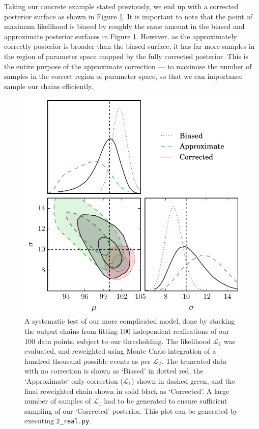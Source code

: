 \documentclass[a4paper,fleqn,usenatbib]{mnras}
\begin{document}
Taking our concrete example stated previously, we end up with a corrected posterior surface as shown in Figure \ref{fig:real}. It is important to note that the point of maximum likelihood is biased by roughly the same amount in the biased and approximate posterior surfaces in Figure \ref{fig:real}. However, as the approximately correctly posterior is broader than the biased surface, it has far more samples in the region of parameter space mapped by the fully corrected posterior. This is the entire purpose of the approximate correction --- to maximise the number of samples in the correct region of parameter space, so that we can importance sample our chains efficiently.
\begin{figure}
	\begin{center}
		\includegraphics[width=\columnwidth]{fig_2_real.pdf}
	\end{center}
	\caption{A systematic test of our more complicated model, done by stacking the output chains from fitting 100 independent realisations of our 100 data points, subject to our thresholding. The likelihood $\mathcal{L}_1$ was evaluated, and reweighted using Monte Carlo integration of a hundred thousand possible events as per $\mathcal{L}_2$. The truncated data with no correction is shown as `Biased' in dotted red, the `Approximate` only correction ($\mathcal{L}_1$) shown in dashed green, and the final reweighted chain shown in solid black as `Corrected'. A large number of samples of $\mathcal{L}_1$ had to be generated to ensure sufficient sampling of our `Corrected' posterior.  This plot can be generated by executing \mbox{\texttt{2\_real.py}}.}
	\label{fig:real}
\end{figure}
\end{document}
